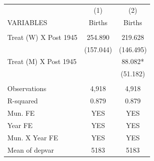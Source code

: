 \begin{tabular}{lcc} \hline
 & (1) & (2) \\
VARIABLES & Births & Births \\ \hline
 &  &  \\
Treat (W) X Post 1945 & 254.890 & 219.628 \\
 & (157.044) & (146.495) \\
Treat (M) X Post 1945 &  & 88.082* \\
 &  & (51.182) \\
 &  &  \\
Observations & 4,918 & 4,918 \\
R-squared & 0.879 & 0.879 \\
Mun. FE & YES & YES \\
Year FE & YES & YES \\
Mun. X Year FE & YES & YES \\
 Mean of depvar & 5183 & 5183 \\ \hline
\end{tabular}
